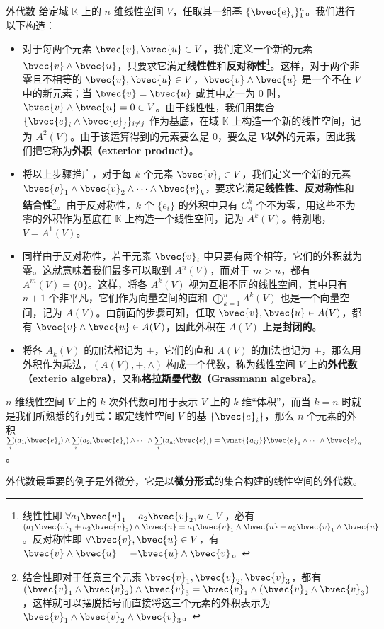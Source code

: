 \begin{example}{外代数}\label{ex_AlgFie_1}
给定域 $\mathbb{K}$ 上的 $n$ 维线性空间 $V$，任取其一组基 $\{\bvec{e}_i\}^n_{1}$。我们进行以下构造：
\begin{itemize}
\item 对于每两个元素 $\bvec{v}, \bvec{u}\in V$，我们定义一个新的元素 $\bvec{v}\wedge \bvec{u}$，只要求它满足\textbf{线性性}和\textbf{反对称性}\footnote{线性性即 $\forall a_1\bvec{v}_1+a_2\bvec{v}_2,{u}\in V$，必有 $(a_1\bvec{v}_1+a_2\bvec{v}_2)\wedge\bvec{u}=a_1\bvec{v}_1\wedge\bvec{u}+a_2\bvec{v}_1\wedge\bvec{u}$。反对称性即 $\forall \bvec{v}, \bvec{u}\in V$，有 $\bvec{v}\wedge\bvec{u}=-\bvec{u}\wedge\bvec{v}$。}。这样，对于两个非零且不相等的 $\bvec{v},\bvec{u}\in V$，$\bvec{v}\wedge \bvec{u}$ 是一个不在 $V$ 中的新元素；当 $\bvec{v}=\bvec{u}$ 或其中之一为 $0$ 时，$\bvec{v}\wedge \bvec{u}=0\in V$。由于线性性，我们用集合 $\{\bvec{e}_i\wedge \bvec{e}_j\}_{i\not=j}$ 作为基底，在域 $\mathbb{K}$ 上构造一个新的线性空间，记为 $A^2(V)$。由于该运算得到的元素要么是 $0$，要么是 $V$\textbf{以外}的元素，因此我们把它称为\textbf{外积（exterior product）}。

\item 将以上步骤推广，对于每 $k$ 个元素 $\bvec{v}_i\in V$，我们定义一个新的元素 $\bvec{v}_1\wedge \bvec{v}_2\wedge\cdots\wedge \bvec{v}_k$，要求它满足\textbf{线性性}、\textbf{反对称性}和\textbf{结合性}\footnote{结合性即对于任意三个元素 $\bvec{v}_1,\bvec{v}_2,\bvec{v}_3$，都有 $(\bvec{v}_1\wedge \bvec{v}_2)\wedge \bvec{v}_3=\bvec{v}_1\wedge(\bvec{v}_2\wedge \bvec{v}_3)$，这样就可以摆脱括号而直接将这三个元素的外积表示为 $\bvec{v}_1\wedge \bvec{v}_2\wedge \bvec{v}_3$。}。由于反对称性，$k$ 个 $\{e_i\}$ 的外积中只有 $C^k_n$ 个不为零，用这些不为零的外积作为基底在 $\mathbb{K}$ 上构造一个线性空间，记为 $A^k(V)$。特别地，$V=A^1(V)$。

\item 同样由于反对称性，若干元素 $\bvec{v}_i$ 中只要有两个相等，它们的外积就为零。这就意味着我们最多可以取到 $A^n(V)$，而对于 $m>n$，都有 $A^m(V)=\{0\}$。这样，将各 $A^k(V)$ 视为互相不同的线性空间，其中只有 $n+1$ 个非平凡，它们作为向量空间的直和 $\bigoplus\limits_{k=1}^n A^k(V)$ 也是一个向量空间，记为 $A(V)$。由前面的步骤可知，任取 $\bvec{v}, \bvec{u}\in A(V)$，都有 $\bvec{v}\wedge\bvec{u}\in A(V)$，因此外积在 $A(V)$ 上是\textbf{封闭的}。
\item 将各 $A_k(V)$ 的加法都记为 $+$，它们的直和 $A(V)$ 的加法也记为 $+$，那么用外积作为乘法，$(A(V), +, \wedge)$ 构成一个代数，称为线性空间 $V$ 上的\textbf{外代数（exterio algebra）}，又称\textbf{格拉斯曼代数（Grassmann algebra）}。
\end{itemize}

\end{example}

$n$ 维线性空间 $V$ 上的 $k$ 次外代数可用于表示 $V$ 上的 $k$ 维“体积”，而当 $k=n$ 时就是我们所熟悉的行列式：取定线性空间 $V$ 的基 $\{\bvec{e}_i\}$，那么 $n$ 个元素的外积 $\sum\limits_{i}(a_{1i}\bvec{e}_i)\wedge\sum\limits_{i}(a_{2i}\bvec{e}_i)\wedge\cdots\wedge\sum\limits_{i}(a_{ni}\bvec{e}_i)=\vmat{\{a_{ij}\}}\bvec{e}_1\wedge\cdots\wedge\bvec{e}_n$。

外代数最重要的例子是外微分，它是以\textbf{微分形式}的集合构建的线性空间的外代数。
